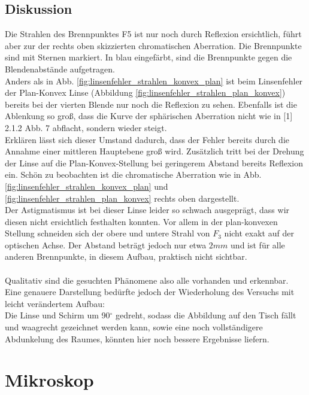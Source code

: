 \documentclass[12pt,a4paper]{article}
\begin{document}
\begin{multicols}{2}



\subsection{Diskussion}
\noindent
Die Strahlen des Brennpunktes F5 ist nur noch durch Reflexion ersichtlich, führt aber zur der rechts oben skizzierten chromatischen Aberration. Die Brennpunkte sind mit Sternen markiert. In blau eingefärbt, sind die Brennpunkte gegen die Blendenabstände aufgetragen.
\\
Anders als in Abb. \ref{fig:linsenfehler_strahlen_konvex_plan} ist beim Linsenfehler der Plan-Konvex Linse (Abbildung \ref{fig:linsenfehler_strahlen_plan_konvex}) bereits bei der vierten Blende nur noch die Reflexion zu sehen. Ebenfalls ist die Ablenkung so groß, dass die Kurve der sphärischen Aberration nicht wie in [1] 2.1.2 Abb. 7 abflacht, sondern wieder steigt. \\
Erklären lässt sich dieser Umstand dadurch, dass der Fehler bereits durch die Annahme einer mittleren Hauptebene groß wird. Zusätzlich tritt bei der Drehung der Linse auf die Plan-Konvex-Stellung bei geringerem Abstand bereits Reflexion ein. Schön zu beobachten ist die chromatische Aberration wie in Abb. \ref{fig:linsenfehler_strahlen_konvex_plan} und \ref{fig:linsenfehler_strahlen_plan_konvex} rechts oben dargestellt.\\ 
Der Astigmatismus ist bei dieser Linse leider so schwach ausgeprägt, dass wir diesen nicht ersichtlich festhalten konnten. Vor allem in der plan-konvexen Stellung schneiden sich der obere und untere Strahl von $F_3$ nicht exakt auf der optischen Achse. Der Abstand beträgt jedoch nur etwa $2mm$ und ist für alle anderen Brennpunkte, in diesem Aufbau, praktisch nicht sichtbar.\\
\\
Qualitativ sind die gesuchten Phänomene also alle vorhanden und erkennbar. Eine genauere Darstellung bedürfte jedoch der Wiederholung des Versuchs mit leicht verändertem Aufbau:\\
Die Linse und Schirm um 90$^\circ$ gedreht, sodass die Abbildung auf den Tisch fällt und waagrecht gezeichnet werden kann, sowie eine noch vollständigere Abdunkelung des Raumes, könnten hier noch bessere Ergebnisse liefern.

\section{Mikroskop}


\end{multicols}
\end{document}
